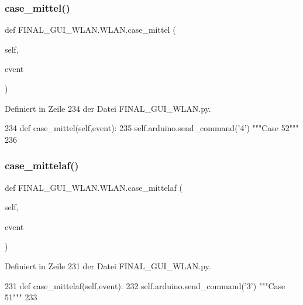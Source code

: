 \subsubsection{\texorpdfstring{case\+\_\+mittel()}{case\_mittel()}}
{\footnotesize\ttfamily def F\+I\+N\+A\+L\+\_\+\+G\+U\+I\+\_\+\+W\+L\+A\+N.\+W\+L\+A\+N.\+case\+\_\+mittel (\begin{DoxyParamCaption}\item[{}]{self,  }\item[{}]{event }\end{DoxyParamCaption})}



Definiert in Zeile 234 der Datei F\+I\+N\+A\+L\+\_\+\+G\+U\+I\+\_\+\+W\+L\+A\+N.\+py.


\begin{DoxyCode}
234     \textcolor{keyword}{def }case\_mittel(self,event):
235         self.arduino.send\_command(\textcolor{stringliteral}{'4'})  \textcolor{stringliteral}{"""Case 52"""}
236  
\end{DoxyCode}
\mbox{\label{class_f_i_n_a_l___g_u_i___w_l_a_n_1_1_w_l_a_n_afa11b6a032018490f3f7e7c9d2efd0bf}} 
\subsubsection{\texorpdfstring{case\+\_\+mittelaf()}{case\_mittelaf()}}
{\footnotesize\ttfamily def F\+I\+N\+A\+L\+\_\+\+G\+U\+I\+\_\+\+W\+L\+A\+N.\+W\+L\+A\+N.\+case\+\_\+mittelaf (\begin{DoxyParamCaption}\item[{}]{self,  }\item[{}]{event }\end{DoxyParamCaption})}



Definiert in Zeile 231 der Datei F\+I\+N\+A\+L\+\_\+\+G\+U\+I\+\_\+\+W\+L\+A\+N.\+py.


\begin{DoxyCode}
231     \textcolor{keyword}{def }case\_mittelaf(self,event):
232         self.arduino.send\_command(\textcolor{stringliteral}{'3'})  \textcolor{stringliteral}{"""Case 51"""}
233     
\end{DoxyCode}
\mbox{\label{class_f_i_n_a_l___g_u_i___w_l_a_n_1_1_w_l_a_n_a00166245d4f6c4df9e40ecaffa66d0eb}} 
